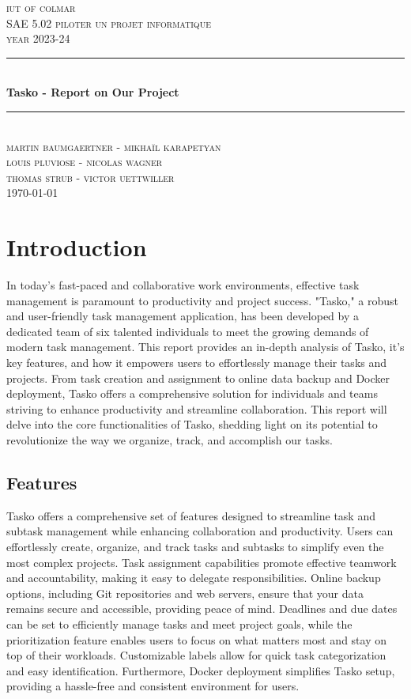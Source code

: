 \documentclass[12pt, a4paper]{article}
\begin{document}
\begin{titlepage}
	\newcommand{\HRule}{\rule{\linewidth}{0.5mm}} 
	\center 
	\textsc{\LARGE iut of colmar}\\[6.5cm] 
	\textsc{\Large SAE 5.02 piloter un projet informatique}\\[0.5cm] 
	\textsc{\large year 2023-24}\\[0.5cm]
	\HRule\\[0.75cm]
	{\Large\bfseries Tasko - Report on Our Project}\\[0.4cm]
	\HRule\\[0.5cm]
	\textsc{\large martin baumgaertner - mikhaïl karapetyan\\louis pluviose - nicolas wagner\\thomas strub - victor uettwiller}\\[6cm] 

	\vfill\vfill\vfill
	{\large\today} 
	\vfill
\end{titlepage}
\newpage
\tableofcontents
\newpage
\section{Introduction}
In today's fast-paced and collaborative work 
environments, effective task management is paramount 
to productivity and project success. "Tasko," a 
robust and user-friendly task management application, 
has been developed by a dedicated team of six talented 
individuals to meet the growing demands of modern task 
management. This report provides an in-depth analysis 
of Tasko, it's key features, and how it empowers users 
to effortlessly manage their tasks and projects. From 
task creation and assignment to online data backup and 
Docker deployment, Tasko offers a comprehensive 
solution for individuals and teams striving to enhance 
productivity and streamline collaboration. This 
report will delve into the core functionalities of 
Tasko, shedding light on its potential to revolutionize 
the way we organize, track, and accomplish our tasks.

\subsection{Features}
Tasko offers a comprehensive set of features designed 
to streamline task and subtask management while 
enhancing collaboration and productivity. Users 
can effortlessly create, organize, and track 
tasks and subtasks to simplify even the most 
complex projects. Task assignment capabilities 
promote effective teamwork and accountability, 
making it easy to delegate responsibilities. 
Online backup options, including Git repositories 
and web servers, ensure that your data remains 
secure and accessible, providing peace of mind. 
Deadlines and due dates can be set to efficiently 
manage tasks and meet project goals, while the 
prioritization feature enables users to focus on 
what matters most and stay on top of their workloads. 
Customizable labels allow for quick task categorization 
and easy identification. Furthermore, Docker deployment 
simplifies Tasko setup, providing a hassle-free and 
consistent environment for users.
\end{document}
